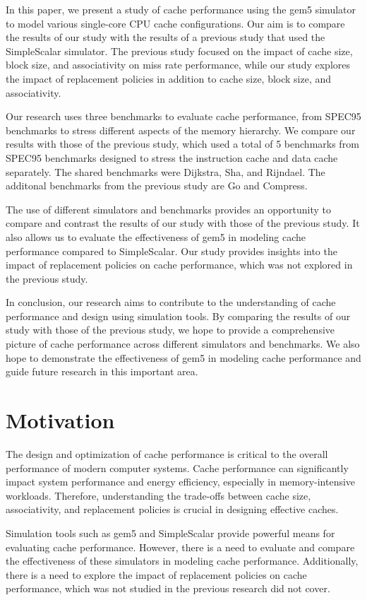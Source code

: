 \documentclass[conference]{IEEEtran}
\begin{document}
In this paper, we present a study of cache performance using the gem5 simulator to model various single-core CPU cache configurations. Our aim is to compare the results of our study with the results of a previous study that used the SimpleScalar simulator. The previous study focused on the impact of cache size, block size, and associativity on miss rate performance, while our study explores the impact of replacement policies in addition to cache size, block size, and associativity.

Our research uses three benchmarks to evaluate cache performance, from SPEC95 benchmarks to stress different aspects of the memory hierarchy. We compare our results with those of the previous study, which used a total of 5 benchmarks from SPEC95 benchmarks designed to stress the instruction cache and data cache separately. The shared benchmarks were Dijkstra, Sha, and Rijndael. The additonal benchmarks from the previous study are Go and Compress.

The use of different simulators and benchmarks provides an opportunity to compare and contrast the results of our study with those of the previous study. It also allows us to evaluate the effectiveness of gem5 in modeling cache performance compared to SimpleScalar. Our study provides insights into the impact of replacement policies on cache performance, which was not explored in the previous study.

In conclusion, our research aims to contribute to the understanding of cache performance and design using simulation tools. By comparing the results of our study with those of the previous study, we hope to provide a comprehensive picture of cache performance across different simulators and benchmarks. We also hope to demonstrate the effectiveness of gem5 in modeling cache performance and guide future research in this important area.

\section{Motivation}
The design and optimization of cache performance is critical to the overall performance of modern computer systems. Cache performance can significantly impact system performance and energy efficiency, especially in memory-intensive workloads. Therefore, understanding the trade-offs between cache size, associativity, and replacement policies is crucial in designing effective caches.

Simulation tools such as gem5 and SimpleScalar provide powerful means for evaluating cache performance. However, there is a need to evaluate and compare the effectiveness of these simulators in modeling cache performance. Additionally, there is a need to explore the impact of replacement policies on cache performance, which was not studied in the previous research did not cover.
\end{document}
